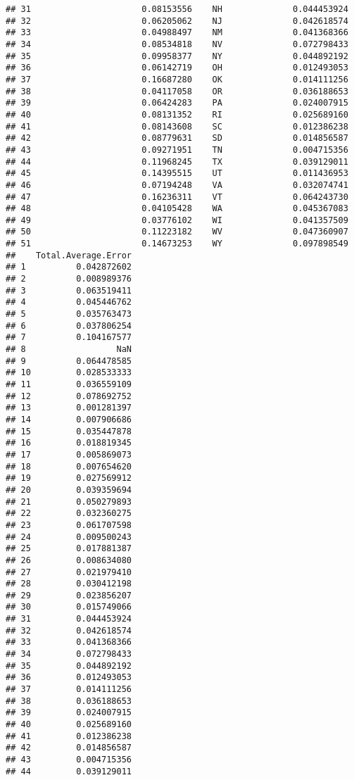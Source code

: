 \documentclass{article}\usepackage[]{graphicx}\usepackage[]{color}
\makeatletter
\newenvironment{kframe}{%
 \def\at@end@of@kframe{}%
 \ifinner\ifhmode%
  \def\at@end@of@kframe{\end{minipage}}%
  \begin{minipage}{\columnwidth}%
 \fi\fi%
 \def\FrameCommand##1{\hskip\@totalleftmargin \hskip-\fboxsep
 \colorbox{shadecolor}{##1}\hskip-\fboxsep
     \hskip-\linewidth \hskip-\@totalleftmargin \hskip\columnwidth}%
 \MakeFramed {\advance\hsize-\width
   \@totalleftmargin\z@ \linewidth\hsize
   \@setminipage}}%
 {\par\unskip\endMakeFramed%
 \at@end@of@kframe}
\newenvironment{knitrout}{}{} %
\makeatother
\begin{document}
\begin{knitrout}
\begin{kframe}
\begin{verbatim}
## 31                      0.08153556    NH              0.044453924
## 32                      0.06205062    NJ              0.042618574
## 33                      0.04988497    NM              0.041368366
## 34                      0.08534818    NV              0.072798433
## 35                      0.09958377    NY              0.044892192
## 36                      0.06142719    OH              0.012493053
## 37                      0.16687280    OK              0.014111256
## 38                      0.04117058    OR              0.036188653
## 39                      0.06424283    PA              0.024007915
## 40                      0.08131352    RI              0.025689160
## 41                      0.08143608    SC              0.012386238
## 42                      0.08779631    SD              0.014856587
## 43                      0.09271951    TN              0.004715356
## 44                      0.11968245    TX              0.039129011
## 45                      0.14395515    UT              0.011436953
## 46                      0.07194248    VA              0.032074741
## 47                      0.16236311    VT              0.064243730
## 48                      0.04105428    WA              0.045367083
## 49                      0.03776102    WI              0.041357509
## 50                      0.11223182    WV              0.047360907
## 51                      0.14673253    WY              0.097898549
##    Total.Average.Error
## 1          0.042872602
## 2          0.008989376
## 3          0.063519411
## 4          0.045446762
## 5          0.035763473
## 6          0.037806254
## 7          0.104167577
## 8                  NaN
## 9          0.064478585
## 10         0.028533333
## 11         0.036559109
## 12         0.078692752
## 13         0.001281397
## 14         0.007906686
## 15         0.035447878
## 16         0.018819345
## 17         0.005869073
## 18         0.007654620
## 19         0.027569912
## 20         0.039359694
## 21         0.050279893
## 22         0.032360275
## 23         0.061707598
## 24         0.009500243
## 25         0.017881387
## 26         0.008634080
## 27         0.021979410
## 28         0.030412198
## 29         0.023856207
## 30         0.015749066
## 31         0.044453924
## 32         0.042618574
## 33         0.041368366
## 34         0.072798433
## 35         0.044892192
## 36         0.012493053
## 37         0.014111256
## 38         0.036188653
## 39         0.024007915
## 40         0.025689160
## 41         0.012386238
## 42         0.014856587
## 43         0.004715356
## 44         0.039129011

\end{verbatim}
\end{kframe}
\end{knitrout}
\end{document}
